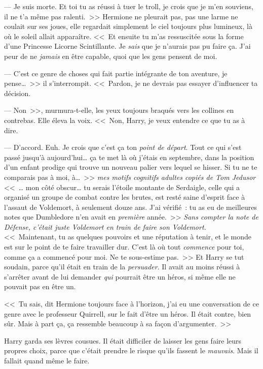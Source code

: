 --- Je suis morte. Et toi tu as réussi à tuer le troll, je crois que je m'en souviens, il ne t'a même pas ralenti.~>> Hermione ne pleurait pas, pas une larme ne coulait sur ses joues, elle regardait simplement le ciel toujours plus lumineux, là où le soleil allait apparaître. <<~Et ensuite tu m'as ressuscitée sous la forme d'une Princesse Licorne Scintillante. Je \emph{sais} que je n'aurais pas pu faire ça. J'ai peur de ne \emph{jamais} en être capable, quoi que les gens pensent de moi.

--- C'est ce genre de choses qui fait partie intégrante de ton aventure, je pense…~>> il s'interrompit. <<~Pardon, je ne devrais pas essayer d'influencer ta décision.

--- Non~>>, murmura-t-elle, les yeux toujours braqués vers les collines en contrebas. Elle éleva la voix. <<~Non, Harry, je veux entendre ce que tu as à dire.

--- D'accord. Euh. Je crois que c'est ça ton \emph{point de départ}. Tout ce qui s'est passé jusqu'à aujourd'hui… ça te met là où j'étais en septembre, dans la position d'un enfant prodige qui trouve un nouveau palier vers lequel se hisser. Si tu ne te comparais pas à moi, à…~>> \emph{mes motifs cognitifs adultes copiés de Tom Jedusor} <<~… mon côté obscur… tu serais l'étoile montante de Serdaigle, celle qui a organisé un groupe de combat contre les brutes, est resté saine d'esprit face à l'assaut de Voldemort, à seulement douze ans. J'ai vérifié~: tu as eu de meilleures notes que Dumbledore n'en avait en \emph{première} année.~>> \emph{Sans compter la note de Défense, c'était juste Voldemort en train de faire son Voldemort.} <<~Maintenant, tu as quelques pouvoirs et une réputation à tenir, et le monde est sur le point de te faire travailler dur. C'est là où tout \emph{commence} pour toi, comme ça a commencé pour moi. Ne te sous-estime pas.~>> Et Harry se tut soudain, parce qu'il était en train de la \emph{persuader}. Il avait au moins réussi à s'arrêter avant de lui demander \emph{qui} pourrait être un héros, si même elle ne pouvait pas en être un.

<<~Tu sais, dit Hermione toujours face à l'horizon, j'ai eu une conversation de ce genre avec le professeur Quirrell, sur le fait d'être un héros. Il était contre, bien sûr. Mais à part ça, ça ressemble beaucoup à sa façon d'argumenter.~>>

Harry garda ses lèvres cousues. Il était difficiler de laisser les gens faire leurs propres choix, parce que c'était prendre le risque qu'ils fassent le \emph{mauvais}. Mais il fallait quand même le faire.


